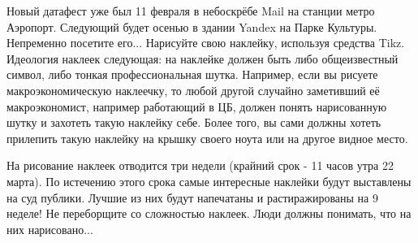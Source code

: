 \documentclass[12pt, a4paper, oneside]{article}
\begin{document}

Новый датафест уже был 11 февраля в небоскрёбе Mail на станции метро Аэропорт. Следующий будет осенью в здании Yandex на Парке Культуры. Непременно посетите его... Нарисуйте свою наклейку, используя средства Tikz. Идеология наклеек следующая: на наклейке должен быть либо общеизвестный символ, либо тонкая профессиональная шутка. Например, если вы рисуете макроэкономическую наклеечку, то любой другой случайно заметивший её макроэкономист, например работающий в ЦБ, должен понять нарисованную шутку и захотеть такую наклейку себе. Более того, вы сами должны хотеть прилепить такую наклейку на крышку своего ноута или на другое видное место.

На рисование наклеек отводится три недели (крайний срок - 11 часов утра 22 марта). По истечению этого срока самые интересные наклейки будут выставлены на суд публики. Лучшие из них будут напечатаны и растиражированы на 9 неделе! Не переборщите со сложностью наклеек. Люди должны понимать, что на них нарисовано...
\end{document}
